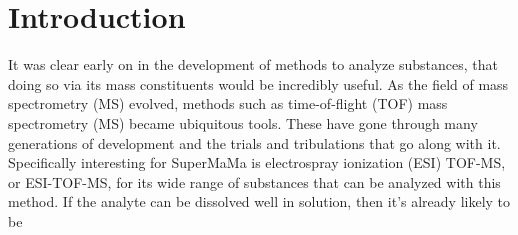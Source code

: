 \chapter{Introduction}
It was clear early on in the development of methods to analyze substances, that doing so via its mass constituents would be incredibly useful. As the field of mass spectrometry (MS) evolved, methods such as time-of-flight (TOF) mass spectrometry (MS) became ubiquitous tools. These have gone through many generations of development and the trials and tribulations that go along with it. Specifically interesting for SuperMaMa is electrospray ionization (ESI) TOF-MS, or ESI-TOF-MS, for its wide range of substances that can be analyzed with this method. If the analyte can be dissolved well in solution, then it's already likely to be 



